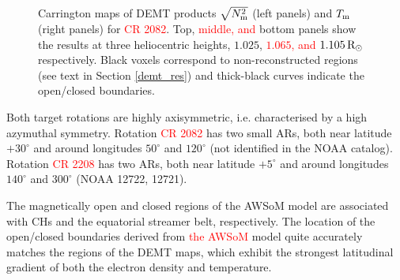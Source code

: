 \documentclass[namedreferences]{solarphysics}
\def\edit#1{\textcolor{Red}{#1}}
\newcommand{\mdeg}{^\circ}
\newcommand{\mrsun}{{\rm R_\odot}}
\newcommand{\Tm}{T_{\rm m}}
\newcommand{\Nsqm}{N^2_{{\rm m}}}
\newcommand{\sqravgN}{\sqrt{\Nsqm}}
\begin{document}
\begin{article}
\begin{figure}[h!]
\begin{center}
\caption{Carrington maps of DEMT {products $\sqravgN$} (left panels) and $\Tm$ (right panels) for \edit{CR 2082}. Top, \edit{middle, and} bottom panels show the results at three heliocentric heights, $1.025$, \edit{$1.065$, and} $1.105\,\mrsun$ respectively. Black voxels correspond to non-reconstructed regions (see text in Section \ref{demt_res}) and thick-black curves indicate the open/closed boundaries.}
\label{carmaps_demt_2082}
\end{center}
\end{figure}

{Both target rotations are highly axisymmetric, {i.e.} characterised by a high azymuthal symmetry. Rotation \edit{CR 2082}} {has} two {small} ARs, both near latitude $+30\mdeg$ and {around longitudes} $50\mdeg$ and $120\mdeg$  {(not identified in the NOAA catalog)}. {Rotation \edit{CR 2208}} {has} two {ARs, both near latitude} $+5\mdeg$ and {around longitudes $140\mdeg$ and $300\mdeg$ {(NOAA 12722, 12721)}.} 

{The magnetically open and closed regions of the AWSoM model are associated {with CHs} and the equatorial streamer belt, respectively. The {location of the} open/closed boundaries derived from \edit{the AWSoM} model quite accurately matches {the regions of the DEMT maps, which exhibit the strongest latitudinal gradient of both the electron density and temperature.}}


\end{article}
\end{document}
